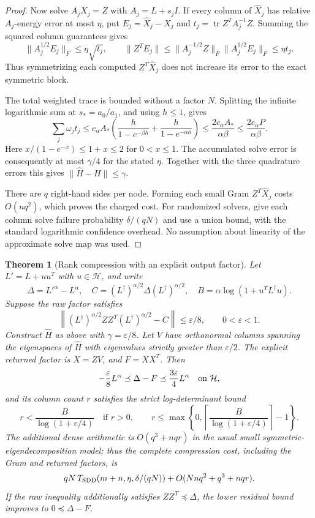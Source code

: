 \documentclass[11pt]{article}
\newtheorem{theorem}{Theorem}
\newcommand{\tr}{\operatorname{tr}}
\begin{document}
\begin{proof}
Now solve $A_jX_j=Z$ with $A_j=L+s_jI$.
If every column of $\widehat X_j$ has relative $A_j$-energy error
at most $\eta$, put $E_j=\widehat X_j-X_j$ and
$t_j=\tr Z^TA_j^{-1}Z$.  Summing the squared column guarantees gives
\[
 \|A_j^{1/2}E_j\|_F\le\eta\sqrt{t_j},
 \qquad
 \|Z^TE_j\|\le
      \|A_j^{-1/2}Z\|_F\|A_j^{1/2}E_j\|_F
      \le\eta t_j.
\]
Thus symmetrizing each computed $Z^T\widehat X_j$ does not increase
its error to the exact symmetric block.

The total weighted trace is bounded without a factor $N$.
Splitting the infinite logarithmic sum at $s_*=a_0/a_1$, and using
$h\le1$, gives
\[
 \sum_j\omega_j t_j
 \le c_\alpha A_*\left(
       \frac{h}{1-e^{-\beta h}}+
       \frac{h}{1-e^{-\alpha h}}\right)
 \le\frac{2c_\alpha A_*}{\alpha\beta}
 \le\frac{2c_\alpha P}{\alpha\beta}.
\]
Here $x/(1-e^{-x})\le1+x\le2$ for $0<x\le1$.
The accumulated solve error is consequently at most $\gamma/4$ for
the stated $\eta$.  Together with the three quadrature errors this
gives $\|\widehat H-H\|\le\gamma$.

There are $q$ right-hand sides per node.  Forming each small Gram
$Z^T\widehat X_j$ costs $O(nq^2)$, which proves the charged cost.
For randomized solvers, give each column solve failure probability
$\delta/(qN)$ and use a union bound, with the standard logarithmic
confidence overhead.  No assumption about linearity of the approximate
solve map was used.
\end{proof}

\begin{theorem}[Rank compression with an explicit output factor]
Let $L'=L+uu^T$ with $u\in\mathcal H$, and write
\[
 \Delta=L'^\alpha-L^\alpha,\quad
 C=(L^\dagger)^{\alpha/2}\Delta(L^\dagger)^{\alpha/2},\quad
 B=\alpha\log(1+u^TL^\dagger u).
\]
Suppose the raw factor satisfies
\[
 \left\|(L^\dagger)^{\alpha/2}ZZ^T(L^\dagger)^{\alpha/2}-C\right\|
       \le\varepsilon/8,
 \qquad 0<\varepsilon<1.
\]
Construct $\widehat H$ as above with $\gamma=\varepsilon/8$.
Let $V$ have orthonormal columns spanning the eigenspaces of
$\widehat H$ with eigenvalues strictly greater than $\varepsilon/2$.
The explicit returned factor is $X=ZV$, and $F=XX^T$.  Then
\[
 -\frac\varepsilon8 L^\alpha
       \preceq\Delta-F\preceq\frac{3\varepsilon}4L^\alpha
       \quad\hbox{on }\mathcal H,
\]
and its column count $r$ satisfies the strict log-determinant bound
\[
 r<\frac{B}{\log(1+\varepsilon/4)}
 \quad\text{if }r>0,
 \qquad
 r\le\max\left\{0,
       \left\lceil\frac{B}{\log(1+\varepsilon/4)}\right\rceil-1\right\}.
\]
The additional dense arithmetic is $O(q^3+nqr)$ in the usual small
symmetric-eigendecomposition model; thus the complete compression
cost, including the Gram and returned factors, is
\[
 qN\,T_{\rm SDD}(m+n,\eta,\delta/(qN))
       +O(Nnq^2+q^3+nqr).
\]
If the raw inequality additionally satisfies $ZZ^T\preceq\Delta$,
the lower residual bound improves to $0\preceq\Delta-F$.
\end{theorem}
\end{document}
